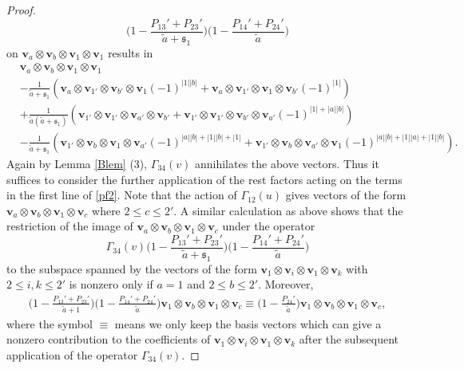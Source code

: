 \documentclass[11pt,reqno]{amsart}
\numberwithin{equation}{section}
\theoremstyle{definition}
\theoremstyle{remark}
\newcommand{\beq}{\begin{equation}}
\newcommand{\eeq}{\end{equation}}
\newcommand{\tl}{\tilde}
\newcommand{\lle}{\leqslant}
\newcommand{\ka}{{\mathfrak s}}
\begin{document}
\begin{proof}
\beq\label{pf3}
\Big(1-\frac{P_{13}'+P_{23}'}{\tl a+\ka_1}\Big)\Big(1-\frac{P_{14}'+P_{24}'}{\tl a}\Big)
\eeq
on $\mathbf v_a\otimes \mathbf v_b\otimes \mathbf v_1\otimes \mathbf v_1$ results in
\begin{align*}
&\mathbf v_a\otimes \mathbf v_b\otimes \mathbf v_1\otimes \mathbf v_1\\
&-\frac{1}{\tl a+\ka_1}(\mathbf v_a\otimes \mathbf v_{1'}\otimes \mathbf v_{b'}\otimes \mathbf v_{1}(-1)^{|1||b|}+\mathbf v_a\otimes \mathbf v_{1'}\otimes \mathbf v_1\otimes \mathbf v_{b'}(-1)^{|1|})\\
&+\frac{1}{\tl a(\tl a+\ka_1)}(\mathbf v_{1'}\otimes \mathbf v_{1'}\otimes \mathbf v_{a'}\otimes \mathbf v_{b'}+\mathbf v_{1'}\otimes \mathbf v_{1'}\otimes \mathbf v_{b'}\otimes \mathbf v_{a'}(-1)^{|1|+|a||b|}) \\
&-\frac{1}{\tl a+\ka_1}(\mathbf v_{1'}\otimes \mathbf v_b\otimes \mathbf v_1\otimes \mathbf v_{a'}(-1)^{|a||b|+|1||b|+|1|}+\mathbf v_{1'}\otimes \mathbf v_b\otimes \mathbf v_{a'}\otimes \mathbf v_{1}(-1)^{|a||b|+|1||a|+|1||b|}).
\end{align*}
Again by Lemma \ref{Blem} (3), $\Gamma_{34}(v)$ annihilates the above vectors. Thus it suffices to consider the  further application of the rest factors acting on the terms in the first line of \eqref{pf2}. Note that the action of $\Gamma_{12}(u)$ gives vectors of the form $\mathbf v_{a}\otimes \mathbf v_b\otimes \mathbf v_1\otimes \mathbf v_{c}$ where $2\lle c\lle 2'$. A similar calculation as above shows that the restriction of the image of $\mathbf v_{a}\otimes \mathbf v_b\otimes \mathbf v_1\otimes \mathbf v_{c}$ under the operator
$$
\Gamma_{34}(v)\Big(1-\frac{P_{13}'+P_{23}'}{\tl a+\ka_1}\Big)\Big(1-\frac{P_{14}'+P_{24}'}{\tl a}\Big)
$$
to the subspace spanned by the vectors of the form $\mathbf v_{1}\otimes \mathbf v_i\otimes \mathbf v_1\otimes \mathbf v_k$ with $2\lle i,k\lle 2'$ is nonzero only if $a=1$ and $2\lle b\lle 2'$. Moreover,
\begin{align*}
\Big(1-\frac{P_{13}'+P_{23}'}{\tl a+1}\Big)\Big(1-\frac{P_{14}'+P_{24}'}{\tl a}\Big)\mathbf v_{1}\otimes \mathbf v_b\otimes \mathbf v_1\otimes \mathbf v_{c}\equiv  \Big(1-\frac{P_{24}'}{\tl a}\Big)\mathbf v_{1}\otimes \mathbf v_b\otimes \mathbf v_1\otimes \mathbf v_{c},
\end{align*}
where the symbol $\equiv$ means we only keep the basis vectors which can give a nonzero contribution to the coefficients of $\mathbf v_1\otimes \mathbf v_i\otimes \mathbf v_1\otimes \mathbf v_k$ after the subsequent application of the operator $\Gamma_{34}(v)$.


\end{proof}
\end{document}
